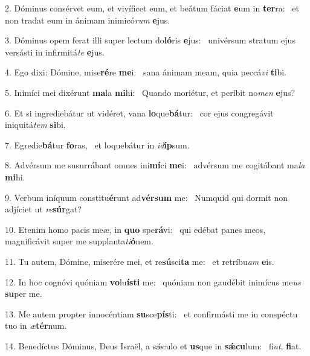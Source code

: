 2. Dóminus consérvet eum, et vivíficet eum, et beátum fáciat \textbf{e}um in \textbf{ter}ra: \ast\  et non tradat eum in ánimam inimicó\textit{rum} \textbf{e}jus.\

3. Dóminus opem ferat illi super lectum do\textbf{ló}ris \textbf{e}jus: \ast\  univérsum stratum ejus versásti in infirmitá\textit{te} \textbf{e}jus.\

4. Ego dixi: Dómine, mise\textbf{ré}re \textbf{me}i: \ast\  sana ánimam meam, quia peccá\textit{vi} \textbf{ti}bi.\

5. Inimíci mei dixérunt \textbf{ma}la \textbf{mi}hi: \ast\  Quando moriétur, et períbit no\textit{men} \textbf{e}jus?\

6. Et si ingrediebátur ut vidéret, vana \textbf{lo}que\textbf{bá}tur: \ast\  cor ejus congregávit iniquitá\textit{tem} \textbf{si}bi.\

7. Egredie\textbf{bá}tur \textbf{fo}ras, \ast\  et loquebátur in \textit{id}\textbf{íp}sum.\

8. Advérsum me susurrábant omnes ini\textbf{mí}ci \textbf{me}i: \ast\  advérsum me cogitábant ma\textit{la} \textbf{mi}hi.\

9. Verbum iníquum constitu\textbf{é}runt ad\textbf{vér}\textbf{sum} me: \ast\  Numquid qui dormit non adjíciet ut \textit{re}\textbf{súr}gat?\

10. Etenim homo pacis meæ, in \textbf{quo} spe\textbf{rá}vi: \ast\  qui edébat panes meos, magnificávit super me supplanta\textit{ti}\textbf{ó}nem.\

11. Tu autem, Dómine, miserére mei, et re\textbf{sú}sci\textbf{ta} me: \ast\  et retríbu\textit{am} \textbf{e}is.\

12. In hoc cognóvi quóniam \textbf{vo}lu\textbf{ís}\textbf{ti} me: \ast\  quóniam non gaudébit inimícus me\textit{us} \textbf{su}per me.\

13. Me autem propter innocéntiam \textbf{su}sce\textbf{pís}ti: \ast\  et confirmásti me in conspéctu tuo in \textit{æ}\textbf{tér}num.\

14. Benedíctus Dóminus, Deus Israël, a sǽculo et \textbf{us}que in \textbf{sǽ}\textbf{cu}lum: \ast\  fi\textit{at}, \textbf{fi}at.\

